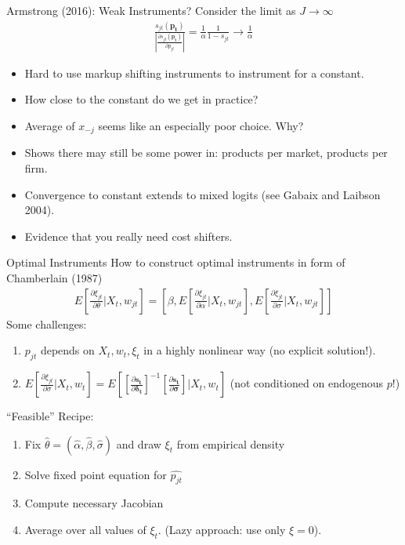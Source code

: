 \documentclass[xcolor=pdftex,dvipsnames,table,mathserif]{beamer}
\begin{document}
\begin{frame}{Armstrong (2016): Weak Instruments?}
Consider the limit as $J \rightarrow \infty$
\begin{eqnarray*}
\frac{s_{jt}(\mathbf{p_t})}{\left|\frac{\partial s_{jt}(\mathbf{p_t})}{\partial p_{jt}}\right|} = \frac{1}{\alpha} \frac{1}{1-s_{jt}} \rightarrow \frac{1}{\alpha}
\end{eqnarray*}
\begin{itemize}
\item Hard to use markup shifting instruments to instrument for a constant.
\item How close to the constant do we get in practice?
\item Average of $x_{-j}$ seems like an especially poor choice. Why?
\item Shows there may still be some power in: products per market, products per firm.
\item Convergence to constant extends to mixed logits (see Gabaix and Laibson 2004).
\item Evidence that you really need cost shifters.
\end{itemize}
\end{frame}

\begin{frame}{Optimal Instruments}
How to construct optimal instruments in form of Chamberlain (1987)
\begin{eqnarray*}
E\left[\frac{\partial \xi_{jt}}{\partial \theta} | X_t, w_{jt} \right] = \left[\beta, E\left[\frac{\partial \xi_{jt}}{\partial \alpha} | X_t, w_{jt} \right] , E[\frac{\partial \xi_{jt}}{\partial \sigma} | X_t, w_{jt} ] \right]
\end{eqnarray*}
Some challenges:
\begin{enumerate}
\item $p_{jt}$ depends on $X_{t}, w_{t}, \xi_{t}$ in a highly nonlinear way (no explicit solution!).
\item $E[\frac{\partial \xi_{jt}}{\partial \sigma} | X_t, w_{t} ] =E[[\frac{\partial \mathbf{s_t}}{\partial \mathbf{\delta_t}}]^{-1} [\frac{\partial \mathbf{s_t}}{\partial \mathbf{\sigma}}] | X_t, w_{t} ]$  (not conditioned on endogenous $p$!)
\end{enumerate}
``Feasible'' Recipe:
\begin{enumerate}
\item Fix $\hat{\theta}=(\hat{\alpha},\hat{\beta},\hat{\sigma})$ and draw $\xi_t$ from empirical density
\item Solve fixed point equation for $\hat{p_{jt}}$
\item Compute necessary Jacobian
\item Average over all values of $\xi_t$. (Lazy approach: use only $\xi =0$).
\end{enumerate}
\end{frame}
\end{document}
